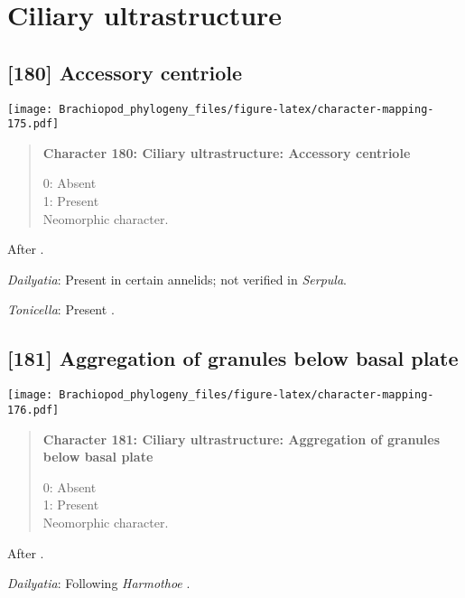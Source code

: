 \documentclass[openany]{book}
\theoremstyle{definition}
\theoremstyle{definition}
\theoremstyle{definition}
\theoremstyle{remark}
\begin{document}
\section{Ciliary ultrastructure}\label{ciliary-ultrastructure}

\subsection*{{[}180{]} Accessory centriole}\label{accessory-centriole}

\texttt{[image: Brachiopod\_phylogeny\_files/figure-latex/character-mapping-175.pdf]}

\begin{quote}
\textbf{Character 180: Ciliary ultrastructure: Accessory centriole}

0: Absent\\
1: Present\\
Neomorphic character.
\end{quote}

After \citet{Lundin2009}.

\hypertarget{Dailyatia-coding-180}{}
\emph{Dailyatia}: Present in certain annelids; not verified in
\emph{Serpula}.

\hypertarget{Tonicella-coding-180}{}
\emph{Tonicella}: Present \citep{Luter1995}.

\subsection*{{[}181{]} Aggregation of granules below basal
plate}\label{aggregation-of-granules-below-basal-plate}

\texttt{[image: Brachiopod\_phylogeny\_files/figure-latex/character-mapping-176.pdf]}

\begin{quote}
\textbf{Character 181: Ciliary ultrastructure: Aggregation of granules
below basal plate}

0: Absent\\
1: Present\\
Neomorphic character.
\end{quote}

After \citet{Lundin2009}.

\hypertarget{Dailyatia-coding-181}{}
\emph{Dailyatia}: Following \emph{Harmothoe} \citep{Holborow1969}.
\end{document}
